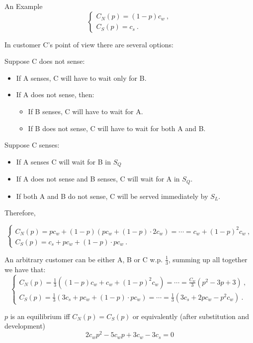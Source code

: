 \documentclass[10pt,a4paper]{article}
\begin{document}
\begin{section}{An Example}
\begin{equation}\begin{cases}
 	C_{N}(p) = (1-p)c_w \:, \\
	C_{S}(p) = c_{s} \:.
\end{cases}
\end{equation}

In customer C's point of view there are several options:

Suppose C does not sense: 
\begin{itemize}
\item If A senses, C will have to wait only for B.
\item If A does not sense, then:
	\begin{itemize}
	\item If B senses, C will have to wait for A.
	\item If B does not sense, C will have to wait for both A and B.	
	\end{itemize}
\end{itemize}

Suppose C senses:
\begin{itemize}
\item If A senses C will wait for B in $S_Q$ 
\item If A does not sense and B senses, C will wait for A in $S_Q$.
\item If both A and B do not sense, C will be served immediately by $S_L$.
\end{itemize}
Therefore,

\begin{equation}\begin{cases}
 	C_{N}(p) = pc_w + (1-p)(pc_w+(1-p)\cdot2c_w) = \cdots = c_w + (1-p)^2c_w \:, \\
	C_{S}(p) = c_{s} + pc_w + (1-p)\cdot p c_w \:.
\end{cases}
\end{equation}

An arbitrary customer can be either A, B or C w.p. $\frac{1}{3}$, summing up all together we have that:
\begin{equation}\begin{cases}
 	C_{N}(p) = \frac{1}{3} \left( (1-p)c_w + c_w + (1-p)^2c_w \right) = \cdots = \frac{C_w}{3}(p^2-3p+3) \:, \\
	C_{S}(p) =  \frac{1}{3} \left(3c_{s} + pc_w + (1-p)\cdot p c_w\right) = \cdots = \frac{1}{3}(3c_s + 2pc_w -p^2c_w)\:.
\end{cases}
\end{equation}

$p$ is an equilibrium iff $C_N(p)=C_S(p)$ or equivalently (after substitution and development)
\[ 2c_w p^2 - 5c_w p + 3c_w - 3c_s = 0 \]



\end{section}
\end{document}
